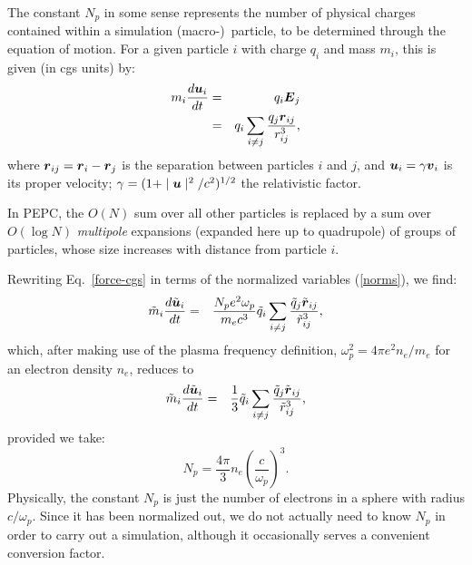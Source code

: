 \documentclass[11pt,psfig]{article}
\def\be{\begin{equation}}
\def\ee{\end{equation}}
\def\bea{\begin{eqnarray}}
\def\eea{\end{eqnarray}}
\newcommand{\bm}[1]{\mbox{\boldmath$#1$}}
\newcommand{\ddt}[1]{\frac{d #1}{d t}}
\newcommand{\half}{{1/2}}
\begin{document}
The constant $N_p$ in some sense represents the number of physical charges contained within a
simulation (macro-)~particle, to be determined through the equation of motion.
For a given particle $i$ with charge $q_i$ and mass $m_i$, this is given (in
cgs units) by: 
\bea
m_i \ddt{\bm{u}_i} &=& q_i \bm{E}_j \nonumber \\
              &=& q_i\sum_{i \neq j} \frac{q_j\bm{r}_{ij}}{r_{ij}^3},
\label{force-cgs}
\eea
where $\bm{r}_{ij} = \bm{r}_i-\bm{r}_j$ is the separation between particles $i$
and $j$, and $\bm{u}_i = \gamma \bm{v}_i$ is its proper velocity;
$\gamma=(1 +\mid\bm{u}\mid^2/c^2)^\half$
the relativistic factor.

In PEPC, the $O(N)$ sum over all other particles is replaced by a sum
over $O(\log N)$ \textit{multipole} expansions (expanded here up to quadrupole) of groups of particles, whose size
increases with distance from particle $i$.  
 
Rewriting Eq.~\ref{force-cgs} in terms of the normalized variables
(\ref{norms}), we find:
\bea
\tilde{m}_i \ddt{\tilde{\bm{u}}_i} 
    &=& \frac{N_pe^2\omega_p}{m_ec^3}\tilde{q}_i\sum_{i \neq j} \frac{\tilde{q}_j\tilde{\bm{r}}_{ij}}{\tilde{r}_{ij}^3},
              \nonumber 
\eea
which, after making use of the plasma frequency definition, $\omega_p^2 =
4\pi e^2n_e/m_e$ for an electron density $n_e$, reduces to
\bea
\tilde{m}_i \ddt{\tilde{\bm{u}}_i} 
    &=& \frac{1}{3}\tilde{q}_i\sum_{i \neq j}
    \frac{\tilde{q}_j\tilde{\bm{r}}_{ij}}{\tilde{r}_{ij}^3},
\label{force-norm}
\eea
provided we take:
\be
N_p = \frac{4\pi}{3} n_e \left(\frac{c}{\omega_p}\right)^3.
\label{Np}
\ee
Physically, the constant $N_p$ is just the number of electrons in a sphere
with radius $c/\omega_p$.  Since it has been normalized out, we do not
actually need to know $N_p$ in order to carry out a simulation, although it
occasionally serves a convenient conversion factor.
\end{document}
